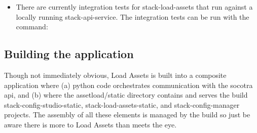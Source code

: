\begin{Shaded}
\begin{Highlighting}[]
\end{Highlighting}
\end{Shaded}

\begin{itemize}
\tightlist
\item
  There are currently integration tests for stack-load-assets that run
  against a locally running stack-api-service. The integration tests can
  be run with the command:
\end{itemize}

\begin{Shaded}
\begin{Highlighting}[]
\end{Highlighting}
\end{Shaded}

\hypertarget{building-the-application}{%
\subsection{Building the application}\label{building-the-application}}

Though not immediately obvious, Load Assets is built into a composite
application where (a) python code orchestrates communication with the
socotra api, and (b) where the assetload/static directory contains and
serves the build stack-config-studio-static, stack-load-assets-static,
and stack-config-manager projects. The assembly of all these elements is
managed by the build so just be aware there is more to Load Assets than
meets the eye.
